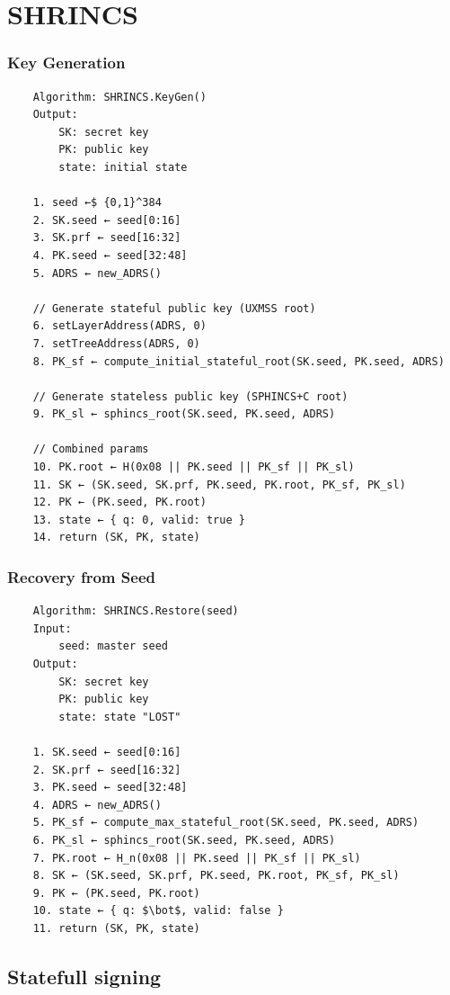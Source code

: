 \section{SHRINCS}

\subsubsection{Key Generation}

\begin{verbatim}
    Algorithm: SHRINCS.KeyGen()
    Output:
        SK: secret key
        PK: public key  
        state: initial state

    1. seed ←$ {0,1}^384
    2. SK.seed ← seed[0:16]
    3. SK.prf ← seed[16:32]
    4. PK.seed ← seed[32:48]
    5. ADRS ← new_ADRS()

    // Generate stateful public key (UXMSS root)
    6. setLayerAddress(ADRS, 0)
    7. setTreeAddress(ADRS, 0)
    8. PK_sf ← compute_initial_stateful_root(SK.seed, PK.seed, ADRS)

    // Generate stateless public key (SPHINCS+C root)
    9. PK_sl ← sphincs_root(SK.seed, PK.seed, ADRS)

    // Combined params
    10. PK.root ← H(0x08 || PK.seed || PK_sf || PK_sl)
    11. SK ← (SK.seed, SK.prf, PK.seed, PK.root, PK_sf, PK_sl)
    12. PK ← (PK.seed, PK.root)
    13. state ← { q: 0, valid: true }
    14. return (SK, PK, state)
\end{verbatim}

\subsubsection{Recovery from Seed}

\begin{verbatim}
    Algorithm: SHRINCS.Restore(seed)
    Input:
        seed: master seed
    Output:
        SK: secret key
        PK: public key
        state: state "LOST"

    1. SK.seed ← seed[0:16]
    2. SK.prf ← seed[16:32]
    3. PK.seed ← seed[32:48]
    4. ADRS ← new_ADRS()
    5. PK_sf ← compute_max_stateful_root(SK.seed, PK.seed, ADRS)
    6. PK_sl ← sphincs_root(SK.seed, PK.seed, ADRS)
    7. PK.root ← H_n(0x08 || PK.seed || PK_sf || PK_sl)
    8. SK ← (SK.seed, SK.prf, PK.seed, PK.root, PK_sf, PK_sl)
    9. PK ← (PK.seed, PK.root)
    10. state ← { q: $\bot$, valid: false } 
    11. return (SK, PK, state)
\end{verbatim}

\subsection{Statefull signing}

